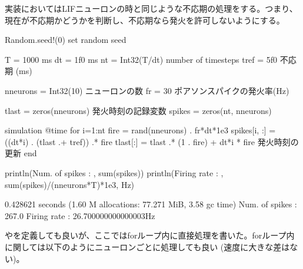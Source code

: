 \documentclass[letterpaper,10pt,english]{sphinxmanual}
\begin{document}
実装においてはLIFニューロンの時と同じような不応期の処理をする。つまり、現在が不応期かどうかを判断し、不応期なら発火を許可しないようにする。

\begin{sphinxVerbatim}[commandchars=\\\{\}]
Random.seed!(0) \PYGZsh{} set random seed

T = 1000 \PYGZsh{} ms
dt = 1f0 \PYGZsh{} ms
nt = Int32(T/dt) \PYGZsh{} number of timesteps
tref = 5f0 \PYGZsh{} 不応期 (ms)

n\PYGZus{}neurons = Int32(10) \PYGZsh{} ニューロンの数
fr = 30 \PYGZsh{} ポアソンスパイクの発火率(Hz)

tlast = zeros(n\PYGZus{}neurons) \PYGZsh{} 発火時刻の記録変数
spikes = zeros(nt, n\PYGZus{}neurons)

\PYGZsh{} simulation
@time for i=1:nt
    fire = rand(n\PYGZus{}neurons) .\PYGZlt{} fr*dt*1e\PYGZhy{}3
    spikes[i, :] = ((dt*i) .\PYGZgt{} (tlast .+ tref)) .* fire
    tlast[:] = tlast .* (1 .\PYGZhy{} fire) + dt*i * fire \PYGZsh{} 発火時刻の更新
end

println(\PYGZdq{}Num. of spikes : \PYGZdq{}, sum(spikes))
println(\PYGZdq{}Firing rate : \PYGZdq{}, sum(spikes)/(n\PYGZus{}neurons*T)*1e3, \PYGZdq{}Hz\PYGZdq{})
\end{sphinxVerbatim}

\begin{sphinxVerbatim}[commandchars=\\\{\}]
  0.428621 seconds (1.60 M allocations: 77.271 MiB, 3.58\PYGZpc{} gc time)
Num. of spikes : 267.0
Firing rate : 26.700000000000003Hz
\end{sphinxVerbatim}

やを定義しても良いが、ここではforループ内に直接処理を書いた。forループ内に関しては以下のようにニューロンごとに処理しても良い (速度に大きな差はない)。

\begin{sphinxVerbatim}[commandchars=\\\{\}]
  
        
     
        \PYG{p}{[} \PYG{p}{]}    \PYG{p}{[}\PYG{p}{]}   \PYG{p}{[}\PYG{p}{]} 
        \PYG{p}{[}\PYG{p}{]}  \PYG{p}{[}\PYG{p}{]} \PYG{p}{[}\PYG{p}{]} \PYG{p}{[}\PYG{p}{]} 
\end{sphinxVerbatim}
\end{document}
